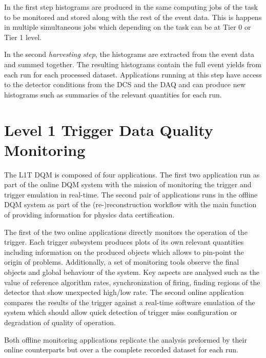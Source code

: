 In the first step histograms are produced in the same computing jobs of the task to be monitored and stored along with the rest of the event data. This is happens in multiple simultaneous jobs which depending on the task can be at Tier 0 or Tier 1 level.

In the second \textit{harvesting step}, the histograms are extracted from the event data and summed together. The resulting histograms contain the full event yields from each run for each processed dataset. Applications running at this step have access to the detector conditions from the \gls{DCS} and the \gls{DAQ} and can produce new histograms such as summaries of the relevant quantities for each run.

\section{Level 1 Trigger Data Quality Monitoring}
\label{SECTION:TechnicalWork_L1TDQM}


The \acrfull{L1T} \acrfull{DQM} is composed of four applications. The first two application run as part of the online \gls{DQM} system with the mission of monitoring the trigger and trigger emulation in real-time. The second pair of applications runs in the offline \gls{DQM} system as part of the (re-)reconstruction workflow with the main function of providing information for physics data certification.

The first of the two online applications directly monitors the operation of the trigger. Each trigger subsystem produces plots of its own relevant quantities including information on the produced objects which allows to pin-point the origin of problems. Additionally, a set of monitoring tools observe the final objects and global behaviour of the system. Key aspects are analysed such as the value of reference algorithm rates, synchronization of firing, finding regions of the detector that show unexpected high/low rate. The second online application compares the results of the trigger against a real-time software emulation of the system which should allow quick detection of trigger miss configuration or degradation of quality of operation.

Both offline monitoring applications replicate the analysis preformed by their online counterparts but over a the complete recorded dataset for each run.

